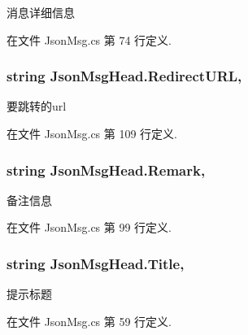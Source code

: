 消息详细信息 



在文件 Json\-Msg.\-cs 第 74 行定义.

\hypertarget{class_json_msg_head_ab6ddde17d5cbb264e0641b09f19e9c22}{
\subsubsection[{Redirect\-U\-R\-L}]{\setlength{\rightskip}{0pt plus 5cm}string Json\-Msg\-Head.\-Redirect\-U\-R\-L\hspace{0.3cm}{\ttfamily [get]}, {\ttfamily [set]}}}\label{class_json_msg_head_ab6ddde17d5cbb264e0641b09f19e9c22}


要跳转的url 



在文件 Json\-Msg.\-cs 第 109 行定义.

\hypertarget{class_json_msg_head_ad1b553e80f96e9a7bb417db79179b2b1}{
\subsubsection[{Remark}]{\setlength{\rightskip}{0pt plus 5cm}string Json\-Msg\-Head.\-Remark\hspace{0.3cm}{\ttfamily [get]}, {\ttfamily [set]}}}\label{class_json_msg_head_ad1b553e80f96e9a7bb417db79179b2b1}


备注信息 



在文件 Json\-Msg.\-cs 第 99 行定义.

\hypertarget{class_json_msg_head_a49bdf4bc535173ee33374933a514e285}{
\subsubsection[{Title}]{\setlength{\rightskip}{0pt plus 5cm}string Json\-Msg\-Head.\-Title\hspace{0.3cm}{\ttfamily [get]}, {\ttfamily [set]}}}\label{class_json_msg_head_a49bdf4bc535173ee33374933a514e285}


提示标题 



在文件 Json\-Msg.\-cs 第 59 行定义.

